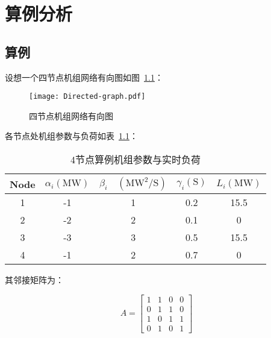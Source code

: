 \chapter{算例分析}
\label{cha:Example}

\section{算例}

设想一个四节点机组网络有向图如图~\ref{fig:Directed-graph}：


\begin{figure}[htbp] %
    \centering
    \texttt{[image: Directed-graph.pdf]}
    \caption{四节点机组网络有向图}
    \label{fig:Directed-graph}
\end{figure}

各节点处机组参数与负荷如表~\ref{tab:example}：

\begin{table}[htbp]
    \centering
    \begin{tabular}{@{}ccccc@{}}
    \toprule
    \multicolumn{1}{c}{Node} & $\alpha_{i}(\mathrm{MW})$  & $\beta_{i} \quad\left(\mathrm{MW}^{2} / \mathrm{S}\right)$ & $\gamma_{i}(\mathrm{S})$   & $L_{i}(\mathrm{MW})$    \\ \midrule
    1                        & -1 & 1 & 0.2 & 15.5 \\
    2                        & -2 & 2 & 0.1 & 0    \\
    3                        & -3 & 3 & 0.5 & 15.5 \\
    4                        & -1 & 2 & 0.7 & 0    \\ \bottomrule
    \end{tabular}
    \caption{4节点算例机组参数与实时负荷}
    \label{tab:example}
\end{table}

其邻接矩阵为：

\begin{equation}
    A=\left[\begin{array}{cccc}
    {1} & {1} & {0} & {0} \\
    {0} & {1} & {1} & {0} \\
    {1} & {0} & {1} & {1} \\
    {0} & {1} & {0} & {1}
    \end{array}\right]
\end{equation}


